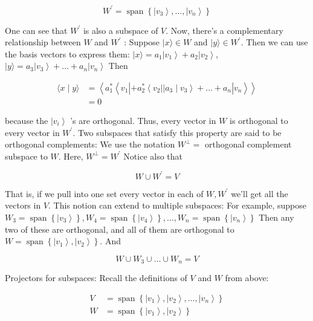 \documentclass[main.tex]{subfiles}
\begin{document}
    $$
    W^{\prime}=\operatorname{span}\left\{\left|v_{3}\right\rangle, \ldots,\left|v_{n}\right\rangle\right\}
    $$
    
    One can see that $W^{\prime}$ is also a subspace of $V$. Now, there's a complementary relationship between $W$ and $W^{\prime}$ : Suppose $|x\rangle \in W$ and $|y\rangle \in W^{\prime}$. Then we can use the basis vectors to express them: $|x\rangle=a_{1}\left|v_{1}\right\rangle+a_{2}\left|v_{2}\right\rangle$,  $|y\rangle=a_{3}\left|v_{3}\right\rangle+\ldots+a_{n}\left|v_{n}\right\rangle$ Then
    
    $$
    \begin{aligned}
    \langle x \mid y\rangle &=\left\langle a_{1}^{*}\left\langle v_{1}\left|+a_{2}^{*}\left\langle v_{2}|| a_{3} \mid v_{3}\right\rangle+\ldots+a_{n}\right| v_{n}\right\rangle\right\rangle \\
    &=0
    \end{aligned}
    $$
    
    because the $\left|v_{i}\right\rangle$ 's are orthogonal. Thus, every vector in $W$ is orthogonal to every vector in $W^{\prime}$. Two subspaces that satisfy this property are said to be orthogonal complements: We use the notation $W^{\perp}=$ orthogonal complement subspace to $W$. Here, $W^{\perp}=W^{\prime}$ Notice also that 
    
    $$
    W \cup W^{\prime}=V
    $$
    
    That is, if we pull into one set every vector in each of $W, W^{\prime}$ we'll get all the vectors in $V$. This notion can extend to multiple subspaces: For example, suppose $W_{3}=\operatorname{span}\left\{\left|v_{3}\right\rangle\right\}, W_{4}=\operatorname{span}\left\{\left|v_{4}\right\rangle\right\}, \ldots, W_{n}=\operatorname{span}\left\{\left|v_{n}\right\rangle\right\}$ Then any two of these are orthogonal, and all of them are orthogonal to $W=\operatorname{span}\left\{\left|v_{1}\right\rangle,\left|v_{2}\right\rangle\right\}$. And
    
    $$
    W \cup W_{3} \cup \ldots \cup W_{n}=V
    $$

    Projectors for subspaces: Recall the definitions of $V$ and $W$ from above:
    
    $$
    \begin{aligned}
    V &=\operatorname{span}\left\{\left|v_{1}\right\rangle,\left|v_{2}\right\rangle, \ldots,\left|v_{n}\right\rangle\right\} \\
    W &=\operatorname{span}\left\{\left|v_{1}\right\rangle,\left|v_{2}\right\rangle\right\}
    \end{aligned}
    $$
    
\end{document}
